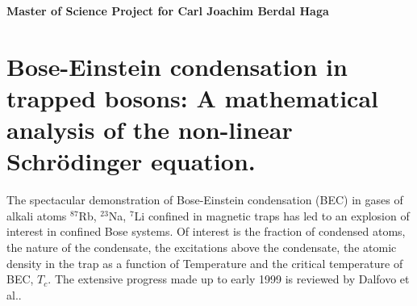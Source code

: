 


\pagestyle{plain}

\begin{center} \huge \bf Master of Science Project for Carl Joachim Berdal Haga 
\end{center}

\section*{Bose-Einstein condensation in trapped bosons: A mathematical analysis of the 
non-linear Schr\"odinger equation.}




The spectacular demonstration of Bose-Einstein condensation (BEC) in gases of
alkali atoms $^{87}$Rb, $^{23}$Na, $^7$Li confined in magnetic
traps\cite{anderson95,davis95,bradley95} has led to an explosion of interest in
confined Bose systems. Of interest is the fraction of condensed atoms, the
nature of the condensate, the excitations above the condensate, the atomic
density in the trap as a function of Temperature and the critical temperature of BEC,
$T_c$. The extensive progress made up to early 1999 is reviewed by Dalfovo et
al.\cite{dalfovo99}. 


